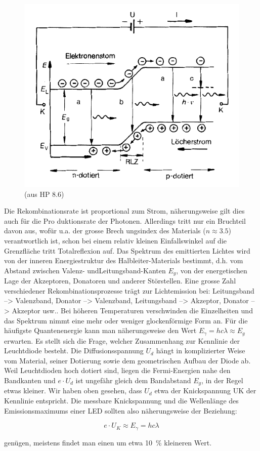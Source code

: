 \clearpage
\begin{figure}
    \centering
    \includegraphics[width=\linewidth]{images/led}
    \caption{(aus HP 8.6)}
    \label{fig:led}
\end{figure}

Die Rekombinationsrate ist  proportional zum Strom, n\"aherungsweise gilt dies
auch f\"ur die  Pro  duktionsrate  der  Photonen.  Allerdings  tritt  nur  ein
Bruchteil davon aus, wof\"ur u.a. der grosse Brech ungsindex des Materials ($n
\approx  3.5$)  verantwortlich  ist,   schon   bei   einem   relativ   kleinen
Einfallswinkel auf die Grenzfl\"ache  tritt  Totalreflexion  auf. Das Spektrum
des  emittierten   Lichtes   wird   von   der   inneren   Energiestruktur  des
Halbleiter-Materials    bestimmt,    d.h.   vom   Abstand   zwischen   Valenz-
undLeitungsband-Kanten  $E_g$,  von  der  energetischen  Lage  der Akzeptoren,
Donatoren   und  anderer  St\"orstellen.  Eine   grosse   Zahl   verschiedener
Rekombinationsprozesse  tr\"agt  zur   Lichtemission   bei:  Leitungsband  -->
Valenzband, Donator --> Valenzband,  Leitungsband  -->  Akzeptor,  Donator -->
Akzeptor  usw..  Bei  h\"oheren Temperaturen verschwinden die Einzelheiten und
das Spektrum  nimmt eine mehr oder weniger glockenf\"ormige Form an. F\"ur die
h\"aufigste Quantenenergie kann man n\"aherungsweise den Wert $E_{\gamma} =  h
c  \lambda  \approx  E_g$  erwarten.  Es  stellt  sich   die   Frage,  welcher
Zusammenhang zur Kennlinie  der  Leuchtdiode  besteht.  Die Diffusionsspannung
$U_d$ h\"angt in komplizierter Weise vom Material,  seiner Dotierung sowie dem
geometrischen Aufbau der Diode ab. Weil Leuchtdioden hoch dotiert sind, liegen
die Fermi-Energien nahe den Bandkanten und $e \cdot U_d$ ist ungef\"ahr gleich
dem Bandabstand $E_g$, in der Regel etwas  kleiner.  Wir  haben  oben gesehen,
dass $U_d$ etwa der Knickspannung UK  der  Kennlinie  entspricht. Die messbare
Knickspannung  und die Wellenl\"ange des Emissionsmaximums einer  LED  sollten
also n\"aherungsweise der Beziehung:

\begin{equation}
    e \cdot U_K \approx E_{\gamma} = h c \lambda
\end{equation}

gen\"ugen, meistens findet man einen um etwa \SI{10}{\percent} kleineren Wert.

